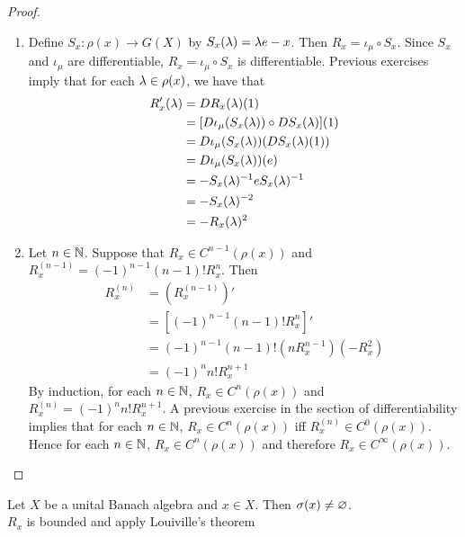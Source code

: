 \documentclass{book}
\begin{document}
\begin{proof}\
	\begin{enumerate}
		\item Define $S_x: \rho(x) \rightarrow G(X)$ by $S_x(\lambda) = \lambda e - x$. Then $R_x = \iota_{\mu} \circ S_x$. Since $S_x$ and $\iota_{\mu}$ are differentiable, $R_x = \iota_{\mu} \circ S_x$ is differentiable. Previous exercises imply that for each $\lambda \in \rho(x)$, we have that
		\begin{align*}
			R_x'(\lambda)
			& = DR_x(\lambda)(1) \\
			& = [D \iota_{\mu}(S_x(\lambda)) \circ DS_x(\lambda)](1) \\
			& = D \iota_{\mu}(S_x(\lambda)) (DS_x(\lambda)(1)) \\
			& = D \iota_{\mu}(S_x(\lambda)) (e) \\
			& = -S_x(\lambda)^{-1} e S_x(\lambda)^{-1} \\
			& = -S_x(\lambda)^{-2} \\
			& = -R_x(\lambda)^2
		\end{align*}
		\item Let $n \in \mathbb{N}$. Suppose that $R_x \in C^{n-1}(\rho(x))$ and $R_x^{(n-1)} =  (-1)^{n-1} (n-1)! R_x^{n}$. Then 
		\begin{align*}
			R_x^{(n)}
			& = (R_x^{(n-1)})' \\
			& = [(-1)^{n-1}(n-1)! R_x^{n}]' \\
			& = (-1)^{n-1}(n-1)! (n R_x^{n-1}) (-R_x^2) \\
			& = (-1)^n n! R_x^{n+1}  
		\end{align*}
		By induction, for each $n \in \mathbb{N}$, $R_x \in C^{n}(\rho(x))$ and $R_x^{(n)} = (-1)^n n! R_x^{n+1}$. A previous exercise in the section of differentiability implies that for each $n \in \mathbb{N}$, $R_x \in C^n(\rho(x))$ iff $R_x^{(n)} \in C^0(\rho(x))$. Hence for each $n \in \mathbb{N}$, $R_x \in C^n(\rho(x))$ and therefore $R_x \in C^{\infty}(\rho(x))$.
	\end{enumerate}
\end{proof}



\begin{ex}
	Let $X$ be a unital Banach algebra and $x \in X$. Then $\sigma(x) \neq \varnothing$. \\
	\tbf{Hint:} $R_x$ is bounded and apply Louiville's theorem
\end{ex}
\end{document}
